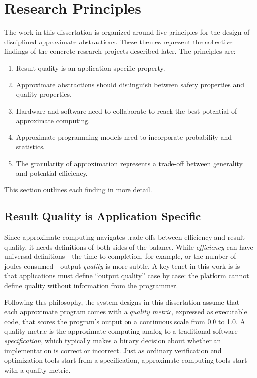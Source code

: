 \section{Research Principles}

The work in this dissertation is organized around five principles
for the design of disciplined approximate abstractions.
These themes represent the collective findings of the concrete research
projects described later.
The principles are:
%
\begin{enumerate}
\item Result quality is an application-specific property.
\item Approximate abstractions should distinguish between safety properties
    and quality properties.
\item Hardware and software need to collaborate to reach the best
    potential of approximate computing.
\item Approximate programming models need to incorporate probability and
    statistics.
\item The granularity of approximation represents a trade-off between
    generality and potential efficiency.
\end{enumerate}
%
This section outlines each finding in more detail.

\subsection{Result Quality is Application Specific}

Since approximate computing navigates trade-offs between efficiency and result
quality, it needs definitions of both sides of the balance.
While \emph{efficiency} can have universal definitions---the time to
completion, for example, or the number of joules consumed---output
\emph{quality} is more subtle.
A key tenet in this work is is that applications must define ``output
quality'' case by case:
the platform cannot define quality without information from the programmer.

Following this philosophy, the system designs in this dissertation assume that
each approximate program comes with a \emph{quality metric}, expressed as
executable code, that scores the program's output on a continuous scale from
0.0 to 1.0.
A quality metric is the approximate-computing analog to a traditional software
\emph{specification}, which typically makes a binary decision about whether an
implementation is correct or incorrect.
Just as ordinary verification and optimization tools start from a
specification, approximate-computing tools start with a quality metric.

